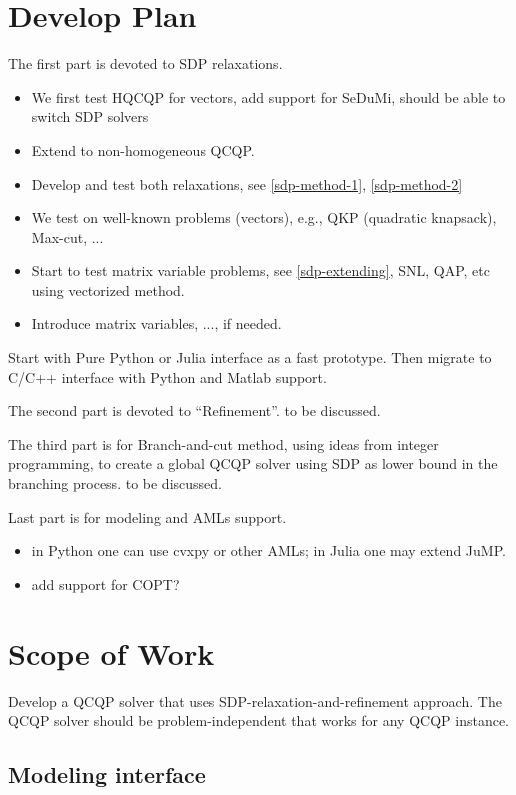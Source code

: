\documentclass[../main]{subfiles}
\begin{document}
\section{Develop Plan}

The first part is devoted to SDP relaxations.

\begin{itemize}
      \tightlist
      \item We first test HQCQP for vectors, add support for SeDuMi, should be able to switch SDP solvers
      \item Extend to non-homogeneous QCQP.
      \item Develop and test both relaxations, see \ref{sdp-method-1}, \ref{sdp-method-2}
      \item We test on well-known problems (vectors), e.g., QKP (quadratic knapsack), Max-cut, ...
      \item Start to test matrix variable problems, see \ref{sdp-extending}, SNL, QAP,
            etc using vectorized method.
      \item Introduce matrix variables, ..., if needed.
\end{itemize}

Start with Pure Python or Julia interface as a fast prototype. Then migrate to C/C++ interface with Python and Matlab support.

The second part is devoted to ``Refinement''. to be discussed.

The third part is for Branch-and-cut method, using ideas from integer programming,
to create a global QCQP solver using SDP as lower bound in the branching process. to be discussed.

Last part is for modeling and AMLs support.

\begin{itemize}
      \tightlist
      \item in Python one can use cvxpy or other AMLs; in Julia one may extend JuMP.
      \item add support for COPT?
\end{itemize}

\section{Scope of Work}
Develop a QCQP solver that uses SDP-relaxation-and-refinement approach.
The QCQP solver should be problem-independent that works for any QCQP
instance.
\subsection{Modeling interface}\label{modeling-interface}
\end{document}
